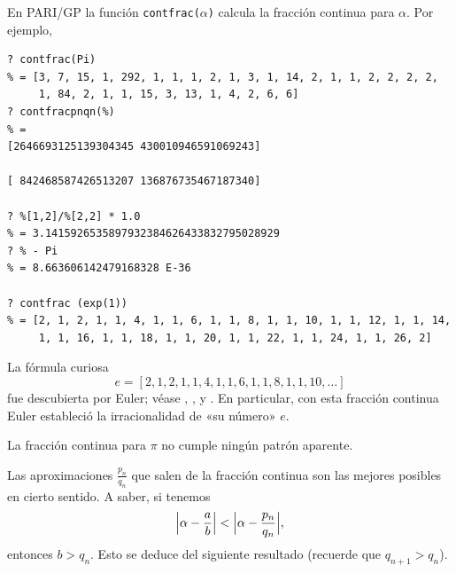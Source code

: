 \begin{shaded}
  En PARI/GP la función \texttt{contfrac($\alpha$)} calcula la fracción continua
  para $\alpha$. Por ejemplo,
\begin{verbatim}
? contfrac(Pi)
% = [3, 7, 15, 1, 292, 1, 1, 1, 2, 1, 3, 1, 14, 2, 1, 1, 2, 2, 2, 2,
     1, 84, 2, 1, 1, 15, 3, 13, 1, 4, 2, 6, 6]
? contfracpnqn(%)
% =
[2646693125139304345 430010946591069243]

[ 842468587426513207 136876735467187340]

? %[1,2]/%[2,2] * 1.0
% = 3.1415926535897932384626433832795028929
? % - Pi
% = 8.663606142479168328 E-36

? contfrac (exp(1))
% = [2, 1, 2, 1, 1, 4, 1, 1, 6, 1, 1, 8, 1, 1, 10, 1, 1, 12, 1, 1, 14,
     1, 1, 16, 1, 1, 18, 1, 1, 20, 1, 1, 22, 1, 1, 24, 1, 1, 26, 2]
\end{verbatim}

  La fórmula curiosa
  $$e = [2, 1, 2, 1, 1, 4, 1, 1, 6, 1, 1, 8, 1, 1, 10, \ldots]$$
  fue descubierta por Euler; véase \cite{Sandifer-2006}, \cite{Olds-1970}, y
  \cite{Cohn-2006}. En particular, con esta fracción continua Euler estableció
  la irracionalidad de «su número» $e$.

  La fracción continua para $\pi$ no cumple ningún patrón aparente.
\end{shaded}

Las aproximaciones $\frac{p_n}{q_n}$ que salen de la fracción continua son las
mejores posibles en cierto sentido. A saber, si tenemos
$$\Bigl|\alpha - \frac{a}{b}\Bigr| < \Bigl|\alpha - \frac{p_n}{q_n}\Bigr|,$$
entonces $b > q_n$. Esto se deduce del siguiente resultado
(recuerde que $q_{n+1} > q_n$).

